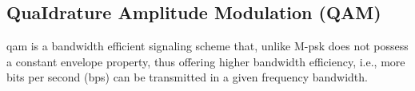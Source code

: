 
\subsection{QuaIdrature Amplitude Modulation (QAM)}
\gls{qam} is a bandwidth efficient signaling scheme that, unlike M-\gls{psk} does not possess a
constant envelope property, thus offering higher bandwidth efficiency, i.e., more bits per second (bps) can be transmitted in a given frequency bandwidth. 






